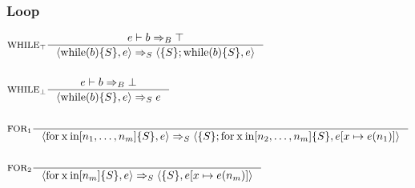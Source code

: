 \subsubsection{Loop}
\newcommand{\Tfor}{\mathbin{\text{for}}}
\newcommand{\Tx}{\mathbin{\text{x}}}
\newcommand{\Tin}{\mathbin{\text{in}}}
\newcommand{\Twhile}{\mathbin{\text{while}}}

\begin{align*}
&\inference[$\text{WHILE}_\top$]{e \vdash b \Rightarrow_B \top}
                       {\Braket{\Twhile(b)\{S\},e} \Rightarrow_S \Braket{\{S\}; \Twhile (b)\{S\},e}}
\\\\
&\inference[$\text{WHILE}_\bot$]{e \vdash b \Rightarrow_B \bot}
                       {\Braket{\Twhile(b)\{S\},e} \Rightarrow_S e}
\\\\
&\inference[$\text{FOR}_{1}$]{}
                       {\Braket{\Tfor \Tx \Tin [n_1,\dots,n_m]\{S\},e} \Rightarrow_S \Braket{\{S\}; \Tfor \mathbin{\text{x}} \mathbin{\text{in}} [n_2,\dots,n_m]\{S\},e[x \mapsto e(n_1)]}}
\\\\
&\inference[$\text{FOR}_{2}$]{}
                       {\Braket{\Tfor \mathbin{\text{x}} \mathbin{\text{in}} [n_m]\{S\},e} \Rightarrow_S \Braket{\{S\},e[x \mapsto e(n_m)]}}
\end{align*}

